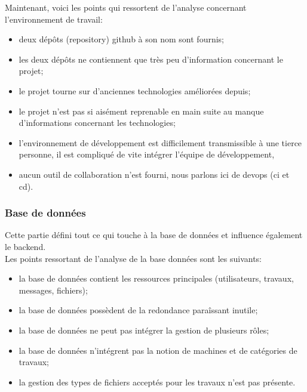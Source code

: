 \documentclass[
    iai, %
    il, %
]{heig-tb}
\begin{document}
Maintenant, voici les points qui ressortent de l'analyse concernant l'environnement de travail:
\begin{itemize}
    \item deux dépôts (\Gls{repository}) \Gls{github} à son nom sont fournis;
    \item les deux dépôts ne contiennent que très peu d'information concernant le projet;
    \item le projet tourne sur d'anciennes technologies améliorées depuis;
    \item le projet n'est pas si aisément reprenable en main suite au manque d'informations concernant les technologies;
    \item l'environnement de développement est difficilement transmissible à une tierce personne, il est compliqué de vite intégrer l'équipe de développement,
    \item aucun outil de collaboration n'est fourni, nous parlons ici de \Gls{devops} (\Gls{ci} et \Gls{cd}).
\end{itemize}

\subsubsection{Base de données}
Cette partie défini tout ce qui touche à la base de données et influence également le \Gls{backend}.\\
Les points ressortant de l'analyse de la base données sont les suivants:
\begin{itemize}
    \item la base de données contient les ressources principales (utilisateurs, travaux, messages, fichiers);
    \item la base de données possèdent de la redondance paraîssant inutile;
    \item la base de données ne peut pas intégrer la gestion de plusieurs rôles;
    \item la base de données n'intégrent pas la notion de machines et de catégories de travaux;
    \item la gestion des types de fichiers acceptés pour les travaux n'est pas présente.
\end{itemize}
\end{document}
